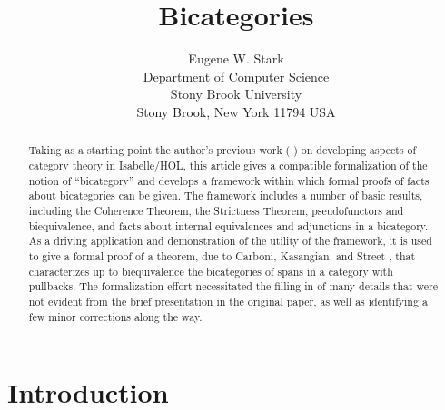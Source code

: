 \documentclass[11pt,notitlepage,a4paper]{report}
\begin{document}
\title{Bicategories}
\author{Eugene W. Stark\\[\medskipamount]
        Department of Computer Science\\
        Stony Brook University\\
        Stony Brook, New York 11794 USA}
\maketitle

\begin{abstract}
Taking as a starting point the author's previous work
(\cite{Category3-AFP} \cite{MonoidalCategory-AFP})
on developing aspects of category theory in Isabelle/HOL, this article gives a
compatible formalization of the notion of ``bicategory'' and develops a
framework within which formal proofs of facts about bicategories can be given.
The framework includes a number of basic results, including the
Coherence Theorem, the Strictness Theorem, pseudofunctors and biequivalence,
and facts about internal equivalences and adjunctions in a bicategory.
As a driving application and demonstration of the utility of the framework,
it is used to give a formal proof of a theorem, due to Carboni, Kasangian,
and Street \cite{carboni-et-al}, that characterizes up to biequivalence
the bicategories of spans in a category with pullbacks.
The formalization effort necessitated the filling-in of many details
that were not evident from the brief presentation in the original paper,
as well as identifying a few minor corrections along the way.
\end{abstract}

\tableofcontents

{}
\chapter*{Introduction}
\end{document}

